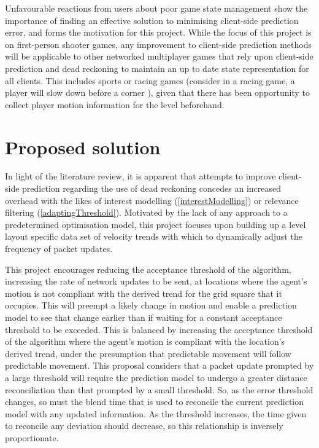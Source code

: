 \documentclass[journal]{IEEEtran}
\begin{document}
Unfavourable reactions from users about poor game state management show the importance of finding an effective solution to minimising client-side prediction error, and forms the motivation for this project. While the focus of this project is on first-person shooter games, any improvement to client-side prediction methods will be applicable to other networked multiplayer games that rely upon client-side prediction and dead reckoning to maintain an up to date state representation for all clients. This includes sports or racing games (consider in a racing game, a player will slow down before a corner \cite{larsson2016movement}), given that there has been opportunity to collect player motion information for the level beforehand.

\section{Proposed solution} \label{proposedsolution}

In light of the literature review, it is apparent that attempts to improve client-side prediction regarding the use of dead reckoning concedes an increased overhead with the likes of interest modelling (\ref{interestModelling}) or relevance filtering (\ref{adaptingThreshold}). Motivated by the lack of any approach to a predetermined optimisation model, this project focuses upon building up a level layout specific data set of velocity trends with which to dynamically adjust the frequency of packet updates.

This project encourages reducing the acceptance threshold of the algorithm, increasing the rate of network updates to be sent, at locations where the agent's motion is not compliant with the derived trend for the grid square that it occupies. This will preempt a likely change in motion and enable a prediction model to see that change earlier than if waiting for a constant acceptance threshold to be exceeded. This is balanced by increasing the acceptance threshold of the algorithm where the agent's motion is compliant with the location's derived trend, under the presumption that predictable movement will follow predictable movement. This proposal considers that a packet update prompted by a large threshold will require the prediction model to undergo a greater distance reconciliation than that prompted by a small threshold. So, as the error threshold changes, so must the blend time that is used to reconcile the current prediction model with any updated information. As the threshold increases, the time given to reconcile any deviation should decrease, so this relationship is inversely proportionate.
\end{document}

